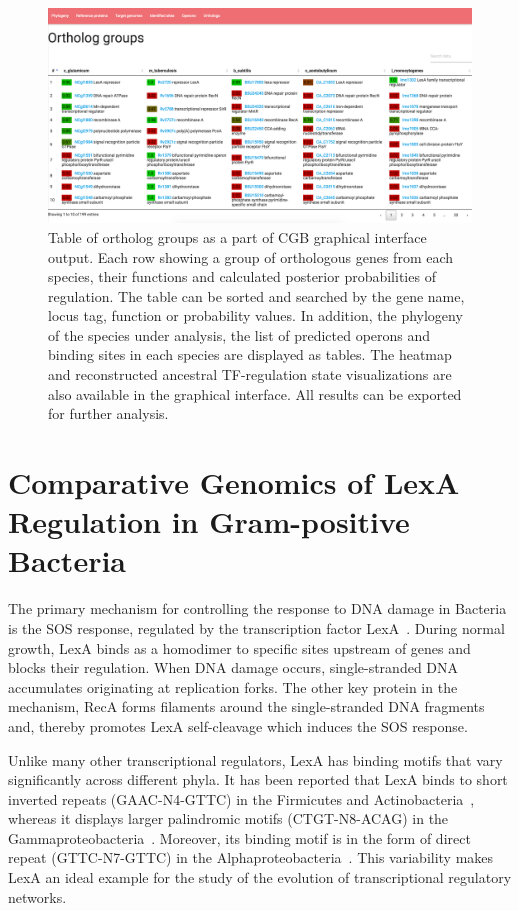 \begin{figure}
  \centering
  \includegraphics[width=\textwidth]{figures/chapter4/output}
  \caption[Table of ortholog groups as a part of CGB graphical interface
  output.]{Table of ortholog groups as a part of CGB graphical interface
    output. Each row showing a group of orthologous genes from each species,
    their functions and calculated posterior probabilities of regulation. The
    table can be sorted and searched by the gene name, locus tag, function or
    probability values. In addition, the phylogeny of the species under
    analysis, the list of predicted operons and binding sites in each species
    are displayed as tables. The heatmap and reconstructed ancestral
    TF-regulation state visualizations are also available in the graphical
    interface. All results can be exported for further analysis.}
  \label{fig:gui-output}
\end{figure}

\section{Comparative Genomics of LexA Regulation in Gram-positive Bacteria}

The primary mechanism for controlling the response to DNA damage in Bacteria is
the SOS response, regulated by the transcription factor
LexA~\citep{radman1975sos, erill2007aeons, michel2005after}. During normal
growth, LexA binds as a homodimer to specific sites upstream of genes and
blocks their regulation. When DNA damage occurs, single-stranded DNA
accumulates originating at replication forks. The other key protein in the
mechanism, RecA forms filaments around the single-stranded DNA fragments and,
thereby promotes LexA self-cleavage which induces the SOS response.

Unlike many other transcriptional regulators, LexA has binding motifs that vary
significantly across different phyla. It has been reported that LexA binds to
short inverted repeats (GAAC-N4-GTTC) in the Firmicutes and
Actinobacteria~\citep{au2005genetic, davis2002definition}, whereas it displays
larger palindromic motifs (CTGT-N8-ACAG) in the
Gammaproteobacteria~\citep{erill2003silico,
  fernandez2000identification}. Moreover, its binding motif is in the form of
direct repeat (GTTC-N7-GTTC) in the
Alphaproteobacteria~\citep{erill2004differences, fernandez1998identification}.
This variability makes LexA an ideal example for the study of the evolution
of transcriptional regulatory networks.


